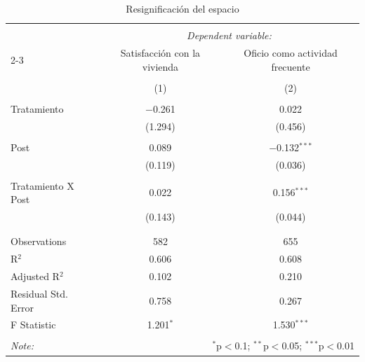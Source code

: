 
\begin{table}[H] \centering 
  \caption{Resignificación del espacio} 
  \label{reg_resignification} 
\tiny 
\begin{tabular}{@{\extracolsep{-7pt}}lcc} 
\\[-1.8ex]\hline 
\hline \\[-1.8ex] 
 & \multicolumn{2}{c}{\textit{Dependent variable:}} \\ 
\cline{2-3} 
 & Satisfacción con la vivienda & Oficio como actividad frecuente \\ 
\\[-1.8ex] & (1) & (2)\\ 
\hline \\[-1.8ex] 
 Tratamiento & $-$0.261 & 0.022 \\ 
  & (1.294) & (0.456) \\ 
  & & \\ 
 Post & 0.089 & $-$0.132$^{***}$ \\ 
  & (0.119) & (0.036) \\ 
  & & \\ 
 Tratamiento X Post & 0.022 & 0.156$^{***}$ \\ 
  & (0.143) & (0.044) \\ 
  & & \\ 
\hline \\[-1.8ex] 
Observations & 582 & 655 \\ 
R$^{2}$ & 0.606 & 0.608 \\ 
Adjusted R$^{2}$ & 0.102 & 0.210 \\ 
Residual Std. Error & 0.758 & 0.267 \\ 
F Statistic & 1.201$^{*}$ & 1.530$^{***}$ \\ 
\hline 
\hline \\[-1.8ex] 
\textit{Note:}  & \multicolumn{2}{r}{$^{*}$p$<$0.1; $^{**}$p$<$0.05; $^{***}$p$<$0.01} \\ 
\end{tabular} 
\end{table} 
